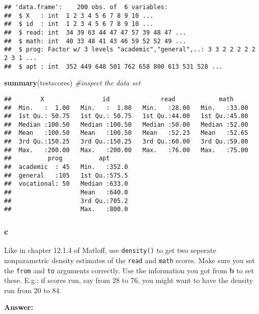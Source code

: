 \documentclass[]{article}
\newenvironment{Shaded}{\begin{snugshade}}{\end{snugshade}}
\newcommand{\CommentTok}[1]{\textcolor[rgb]{0.56,0.35,0.01}{\textit{#1}}}
\newcommand{\KeywordTok}[1]{\textcolor[rgb]{0.13,0.29,0.53}{\textbf{#1}}}
\newcommand{\NormalTok}[1]{#1}
\begin{document}
\begin{verbatim}
## 'data.frame':    200 obs. of  6 variables:
##  $ X   : int  1 2 3 4 5 6 7 8 9 10 ...
##  $ id  : int  1 2 3 4 5 6 7 8 9 10 ...
##  $ read: int  34 39 63 44 47 47 57 39 48 47 ...
##  $ math: int  40 33 48 41 43 46 59 52 52 49 ...
##  $ prog: Factor w/ 3 levels "academic","general",..: 3 3 2 2 2 2 2 2 3 1 ...
##  $ apt : int  352 449 648 501 762 658 800 613 531 528 ...
\end{verbatim}

\begin{Shaded}
\begin{Highlighting}[]
\KeywordTok{summary}\NormalTok{(testscores) }\CommentTok{#inspect the data set}
\end{Highlighting}
\end{Shaded}

\begin{verbatim}
##        X                id              read            math      
##  Min.   :  1.00   Min.   :  1.00   Min.   :28.00   Min.   :33.00  
##  1st Qu.: 50.75   1st Qu.: 50.75   1st Qu.:44.00   1st Qu.:45.00  
##  Median :100.50   Median :100.50   Median :50.00   Median :52.00  
##  Mean   :100.50   Mean   :100.50   Mean   :52.23   Mean   :52.65  
##  3rd Qu.:150.25   3rd Qu.:150.25   3rd Qu.:60.00   3rd Qu.:59.00  
##  Max.   :200.00   Max.   :200.00   Max.   :76.00   Max.   :75.00  
##          prog          apt       
##  academic  : 45   Min.   :352.0  
##  general   :105   1st Qu.:575.5  
##  vocational: 50   Median :633.0  
##                   Mean   :640.0  
##                   3rd Qu.:705.2  
##                   Max.   :800.0
\end{verbatim}

\hypertarget{c}{%
\subsubsection{c}\label{c}}

Like in chapter 12.1.4 of Matloff, use \texttt{density()} to get two
seperate nonparametric density estimates of the \texttt{read} and
\texttt{math} scores. Make sure you set the \texttt{from} and
\texttt{to} arguments correctly. Use the information you got from
\textbf{b} to set these. E.g.: if scores run, say from 28 to 76, you
might want to have the density run from 20 to 84.

\textbf{Answer:}
\end{document}
